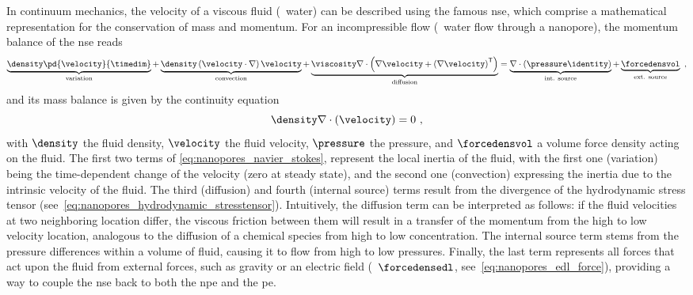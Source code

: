In continuum mechanics, the velocity of a viscous fluid (\eg~water) can be described using the famous
\gls{nse}, which comprise a mathematical representation for the conservation of mass and momentum. For an
incompressible flow (\ie~water flow through a nanopore), the momentum balance of the \gls{nse} reads
%
\begin{equation}\label{eq:nanopores_navier_stokes}
  \underbrace{ \density \pd{\velocity}{\timedim} }_{\text{variation}}
  +
  \underbrace{ \density \left( \velocity \cdot \nabla \right) \velocity }_{\text{convection}}
  +
  \underbrace{ \viscosity \nabla \cdot \left(
    \nabla \velocity + \left(\nabla\velocity \right)^\mathsf{T} \right) }_{\text{diffusion}}
  =
  \underbrace{\nabla \cdot \left(\pressure \identity \right)}_{\text{int. source}}
  +
  \underbrace{ \forcedensvol }_{\text{ext. source}}
  \text{ ,}
\end{equation}
%
and its mass balance is given by the continuity equation
%
\begin{equation}\label{eq:nanopores_velocity_continuity}
  \density \nabla \cdot \left( \velocity \right) = 0
  \text{ ,}
\end{equation}
%
with $\density$ the fluid density, $\velocity$ the fluid velocity, $\pressure$ the pressure, and
$\forcedensvol$ a volume force density acting on the fluid. The first two terms of
\cref{eq:nanopores_navier_stokes}, represent the local inertia of the fluid, with the first one (variation)
being the time-dependent change of the velocity (zero at steady state), and the second one (convection)
expressing the inertia due to the intrinsic velocity of the fluid. The third (diffusion) and fourth (internal
source) terms result from the divergence of the hydrodynamic stress tensor
(see~\cref{eq:nanopores_hydrodynamic_stresstensor}). Intuitively, the diffusion term can be interpreted as
follows: if the fluid velocities at two neighboring location differ, the viscous friction between them will
result in a transfer of the momentum from the high to low velocity location, analogous to the diffusion of a
chemical species from high to low concentration. The internal source term stems from the pressure differences
within a volume of fluid, causing it to flow from high to low pressures. Finally, the last term represents all
forces that act upon the fluid from external forces, such as gravity or an electric field
(\ie~$\forcedensedl$, see~\cref{eq:nanopores_edl_force}), providing a way to couple the \gls{nse} back to both
the \gls{npe} and the \gls{pe}.


